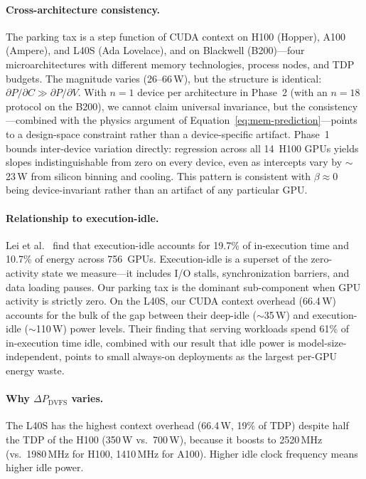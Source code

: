 \documentclass[sigconf,nonacm]{acmart}
\begin{document}
\paragraph{Cross-architecture consistency.} The parking tax is a step function of CUDA context on H100 (Hopper), A100 (Ampere), and L40S (Ada Lovelace), and on Blackwell (B200)---four microarchitectures with different memory technologies, process nodes, and TDP budgets. The magnitude varies (26--66\,W), but the structure is identical: $\partial P / \partial C \gg \partial P / \partial V$. With $n = 1$ device per architecture in Phase~2 (with an $n=18$ protocol on the B200), we cannot claim universal invariance, but the consistency---combined with the physics argument of Equation~\ref{eq:mem-prediction}---points to a design-space constraint rather than a device-specific artifact. Phase~1 bounds inter-device variation directly: regression across all 14~H100 GPUs yields slopes indistinguishable from zero on every device, even as intercepts vary by $\sim$23\,W from silicon binning and cooling. This pattern is consistent with $\beta \approx 0$ being device-invariant rather than an artifact of any particular GPU.

\paragraph{Relationship to execution-idle.} Lei et al.~\cite{lei-idle} find that execution-idle accounts for 19.7\% of in-execution time and 10.7\% of energy across 756~GPUs. Execution-idle is a superset of the zero-activity state we measure---it includes I/O stalls, synchronization barriers, and data loading pauses. Our parking tax is the dominant sub-component when GPU activity is strictly zero. On the L40S, our CUDA context overhead (66.4\,W) accounts for the bulk of the gap between their deep-idle ($\sim$35\,W) and execution-idle ($\sim$110\,W) power levels. Their finding that serving workloads spend 61\% of in-execution time idle, combined with our result that idle power is model-size-independent, points to small always-on deployments as the largest per-GPU energy waste.

\paragraph{Why $\Delta P_{\text{DVFS}}$ varies.} The L40S has the highest context overhead (66.4\,W, 19\% of TDP) despite half the TDP of the H100 (350\,W vs.\ 700\,W), because it boosts to 2520\,MHz (vs.\ 1980\,MHz for H100, 1410\,MHz for A100). Higher idle clock frequency means higher idle power.
\end{document}
